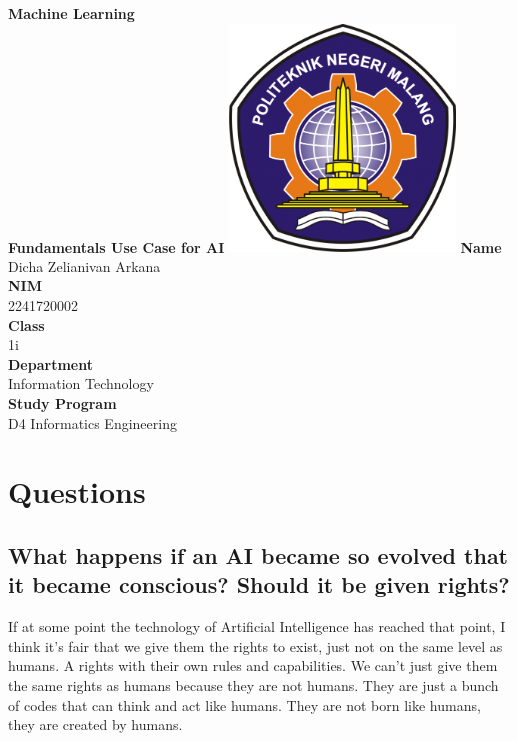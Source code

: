 \documentclass[12pt,titlepage]{article}
\newcommand{\vSubject}{Machine Learning}
\newcommand{\vSubtitle}{Fundamentals Use Case for AI}
\newcommand{\vName}{Dicha Zelianivan Arkana}
\newcommand{\vNIM}{2241720002}
\newcommand{\vClass}{1i}
\newcommand{\vDepartment}{Information Technology}
\newcommand{\vStudyProgram}{D4 Informatics Engineering}
\begin{document}
\begin{titlepage}
    \centering
    \vfill
    {\bfseries\LARGE
        \vSubject\\
        \vskip0.25cm
        \vSubtitle
    }
    \vfill
    \includegraphics[width=6cm]{images/polinema-logo.png}
    \vfill
    {
        \textbf{Name}\\
        \vName\\
        \vskip0.5cm
        \textbf{NIM}\\
        \vNIM\\
        \vskip0.5cm
        \textbf{Class}\\
        \vClass\\
        \vskip0.5cm
        \textbf{Department}\\
        \vDepartment\\
        \vskip0.5cm
        \textbf{Study Program}\\
        \vStudyProgram
    }
\end{titlepage}

\tableofcontents
\pagebreak

\section{Questions}
\subsection{What happens if an AI became so evolved that it became conscious? Should it be given rights?}
If at some point the technology of Artificial Intelligence has reached that point, I think it's fair that we give them
the rights to exist, just not on the same level as humans. A rights with their own rules and capabilities.
We can't just give them the same rights as humans because they are not humans. 
They are just a bunch of codes that can think and act like humans.
They are not born like humans, they are created by humans.
\end{document}
